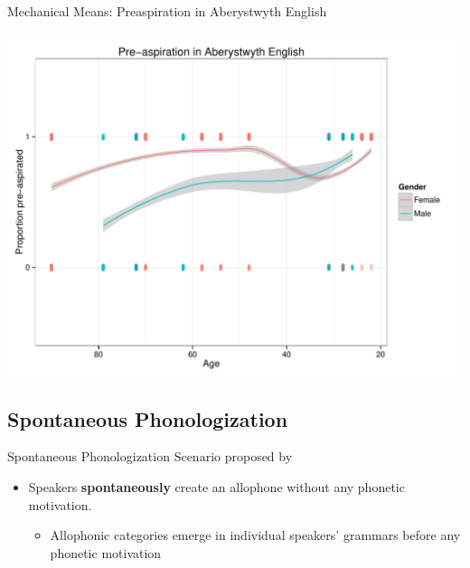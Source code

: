 \documentclass[hyperref={pdfpagelabels=false}]{beamer}
\begin{document}
\begin{frame}{Mechanical Means:  \small{Preaspiration in Aberystwyth English \citep{Hejna2014}}}
\begin{center}
\includegraphics[trim=2cm 2cm 2cm 2cm, clip=false, width=.6\textwidth]{misaplot.pdf}
\end{center}
\end{frame}

\subsection{Spontaneous Phonologization}

\begin{frame}{Spontaneous Phonologization}
	Scenario proposed by \citet{JandaJoseph2003, fruehwald2013} 
	
	\begin{itemize}
		\item Speakers \textbf{spontaneously} create an allophone without any phonetic motivation.  \\
		\begin{itemize}
			\item Allophonic categories emerge in individual speakers' grammars before any phonetic motivation
		\end{itemize}
	\end{itemize}
\end{frame}
\end{document}
